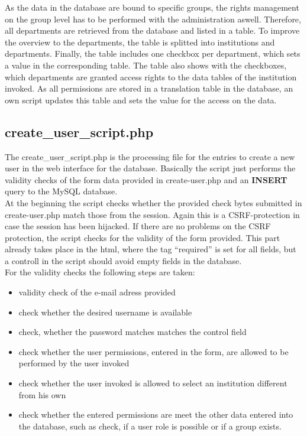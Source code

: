 As the data in the database are bound to specific groups, the rights management on the group level has to be performed with the administration aswell. Therefore, all departments are 
retrieved from the database and listed in a table. To improve the overview to the departments, the table is splitted into institutions and departments. Finally, the table includes 
one checkbox per department, which sets a value in the corresponding table. The table also shows with the checkboxes, which departments are granted access rights to the data tables 
of the institution invoked. As all permissions are stored in a translation table in the database, an own script updates this table 
and sets the value for the access on the data.

\subsection{create\_user\_script.php}
The create\_user\_script.php is the processing file for the entries to create a new user in the web interface for the database. Basically the script just performs the validity checks 
of the form data provided in create-user.php and an \textbf{INSERT} query to the MySQL database.\\
At the beginning the script checks whether the provided check bytes submitted in create-user.php match those from the session. Again this is a CSRF-protection in case the session has
been hijacked. If there are no problems on the CSRF protection, the script checks for the validity of the form provided. This part already takes place in the html, where the tag 
``required'' is set for all fields, but a controll in the script should avoid empty fields in the database.\\
For the validity checks the following steps are taken:
\begin{itemize}
 \item validity check of the e-mail adress provided
 \item check whether the desired username is available
 \item check, whether the password matches matches the control field
 \item check whether the user permissions, entered in the form, are allowed to be performed by the user invoked
 \item check whether the user invoked is allowed to select an institution different from his own
 \item check whether the entered permissions are meet the other data entered into the database, such as check, if a user role is possible or if a group exists.
\end{itemize}
